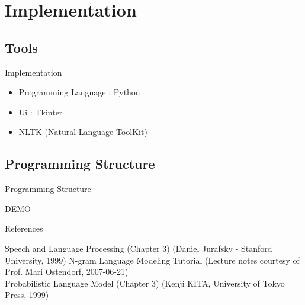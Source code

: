 \documentclass{beamer}
\begin{document}
\section{Implementation}

\subsection{Tools}
\begin{frame}{Implementation}
    \begin{itemize}
        \item Programming Language : Python
        \item Ui : Tkinter
        \item NLTK (Natural Language ToolKit)
    \end{itemize}
\end{frame}

\subsection{Programming Structure}
\begin{frame}{Programming Structure}
    \smartdiagramset{}
    \begin{center}
    \end{center}
\end{frame}

\begin{frame}
    \centering
    \Huge DEMO
\end{frame}

\begin{frame}{References}
    \begin{thebibliography}{4}
            Speech and Language Processing (Chapter 3) (Daniel Jurafsky - Stanford University, 1999)
            N-gram Language Modeling Tutorial (Lecture notes courtesy of Prof. Mari Ostendorf, 2007-06-21)\\
            Probabilistic Language Model (Chapter 3) (Kenji KITA, University of Tokyo Press, 1999)
    \end{thebibliography}
\end{frame}

\end{document}
